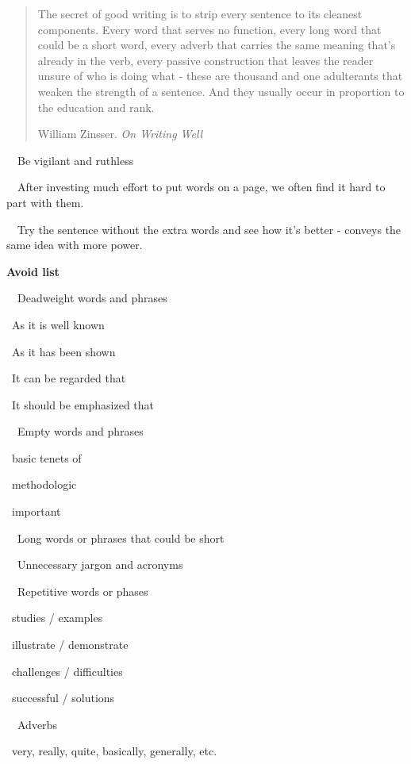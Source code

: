 \documentclass[a4paper, 12pt]{article}
\begin{document}
\vspace{4pt}\begin{quote}
The secret of good writing is to strip every sentence to its cleanest components. 
Every word that serves no function, every long word that could be a short word, 
every adverb that carries the same meaning that's already in the verb, 
every passive construction that leaves the reader unsure of who is doing what
- these are thousand and one adulterants that weaken the strength of a sentence. 
And they usually occur in proportion to the education and rank. 
\begin{flushright}
William Zinsser. \textit{On Writing Well}
\end{flushright}
\end{quote}

\par\ \textbullet\ Be vigilant and ruthless

\par\ \textbullet\ After investing much effort to put words on a page, we often find it hard to part with them.

\par\ \textbullet\ Try the sentence without the extra words and see how it's better - conveys the same idea with more power.

\par\textbf{Avoid list}
\par\ \textbullet\ Deadweight words and phrases
\par\quad\textopenbullet\ As it is well known
\par\quad\textopenbullet\ As it has been shown
\par\quad\textopenbullet\ It can be regarded that
\par\quad\textopenbullet\ It should be emphasized that
\par\ \textbullet\ Empty words and phrases
\par\quad\textopenbullet\ basic tenets of
\par\quad\textopenbullet\ methodologic
\par\quad\textopenbullet\ important
\par\ \textbullet\ Long words or phrases that could be short
\par\ \textbullet\ Unnecessary jargon and acronyms
\par\ \textbullet\ Repetitive words or phases
\par\quad\textopenbullet\ studies / examples
\par\quad\textopenbullet\ illustrate / demonstrate
\par\quad\textopenbullet\ challenges / difficulties
\par\quad\textopenbullet\ successful / solutions
\par\ \textbullet\ Adverbs
\par\quad\textopenbullet\ very, really, quite, basically, generally, etc.
\end{document}

